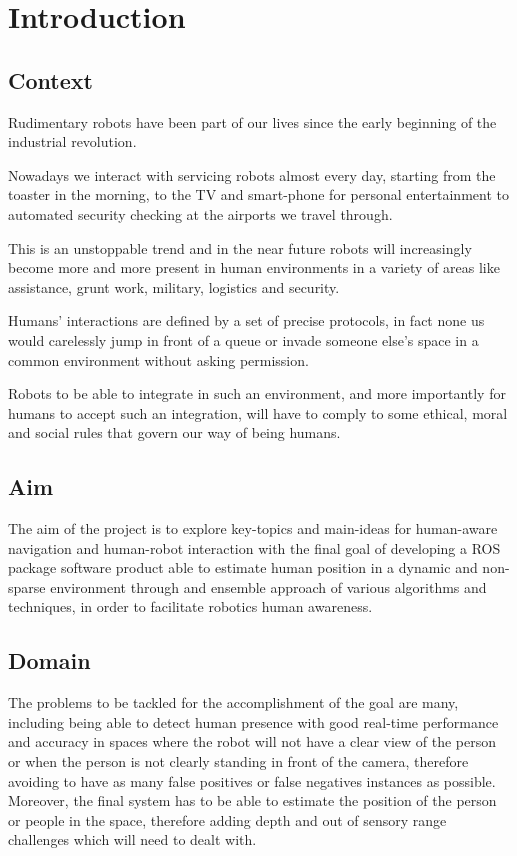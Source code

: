 \chapter{Introduction}
\label{chapter1}

\section{Context}

Rudimentary robots have been part of our lives since the early beginning of the industrial revolution. 

Nowadays we interact with servicing robots almost every day, starting from the toaster in the morning, to the TV and smart-phone for personal entertainment to automated security checking at the airports we travel through. 

This is an unstoppable trend and in the near future robots will increasingly become more and more present in human environments in a variety of areas like assistance, grunt work, military, logistics and security.

Humans' interactions are defined by a set of precise protocols, in fact none us would carelessly jump in front of a queue or invade someone else's space in a common environment without asking permission.

Robots to be able to integrate in such an environment, and more importantly for humans to accept such an integration, will have to comply to some ethical, moral and social rules that govern our way of being humans.

\section{Aim}

The aim of the project is to explore key-topics and main-ideas for human-aware navigation and human-robot interaction with the final goal of developing a ROS package software product able to estimate human position in a dynamic and non-sparse environment through and ensemble approach of various algorithms and techniques, in order to facilitate robotics human awareness.

\section{Domain}

The problems to be tackled for the accomplishment of the goal are many, including being able to detect human presence with good real-time performance and accuracy in spaces where the robot will not have a clear view of the person or when the person is not clearly standing in front of the camera, therefore avoiding to have as many false positives or false negatives instances as possible. Moreover, the final system has to be able to estimate the position of the person or people in the space, therefore adding depth and out of sensory range challenges which will need to dealt with.


